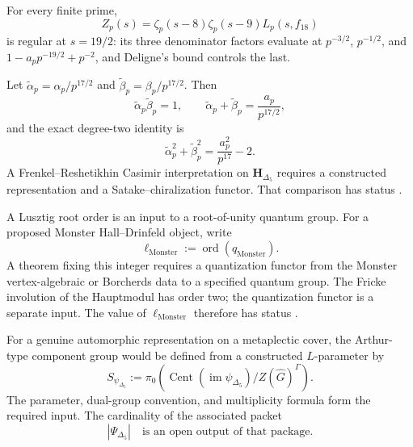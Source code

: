 \begin{remark}
\label{rem:cclimax-sk-euler}
For every finite prime,
\[
 Z_p(s)=\zeta_p(s-8)\zeta_p(s-9)L_p(s,f_{18})
\]
is regular at \(s=19/2\): its three denominator factors evaluate at
\(p^{-3/2}\), \(p^{-1/2}\), and
\(1-a_pp^{-19/2}+p^{-2}\), and Deligne's bound controls the last.
\end{remark}

\begin{remark}
\label{rem:cclimax-satake-casimir}
\label{rem:cclimax-satake-casimir-ii}
Let
\(\widetilde\alpha_p=\alpha_p/p^{17/2}\) and
\(\widetilde\beta_p=\beta_p/p^{17/2}\).  Then
\[
 \widetilde\alpha_p\widetilde\beta_p=1,\qquad
 \widetilde\alpha_p+\widetilde\beta_p=\frac{a_p}{p^{17/2}},
\]
and the exact degree-two identity is
\begin{equation}
\label{eq:cclimax-casimir-dictionary}
 \widetilde\alpha_p^2+\widetilde\beta_p^2
 =\frac{a_p^2}{p^{17}}-2.
\end{equation}
A Frenkel--Reshetikhin Casimir interpretation on
\(\mathbf H_{\Delta_5}\) requires a constructed representation and a
Satake--chiralization functor.  That comparison has status
\ClaimStatusOpen.
\end{remark}

\begin{remark}
\label{rem:cclimax-monster-lusztig-conway-norton}
\ClaimStatusOpen
A Lusztig root order is an input to a root-of-unity quantum group.
For a proposed Monster Hall--Drinfeld object, write
\begin{equation}
\label{eq:cclimax-monster-lusztig-level}
 \ell_{\mathrm{Monster}}
 :=\operatorname{ord}(q_{\mathrm{Monster}}).
\end{equation}
A theorem fixing this integer requires a quantization functor from the
Monster vertex-algebraic or Borcherds data to a specified quantum
group.  The Fricke involution of the Hauptmodul has order two; the
quantization functor is a separate input.  The value of
\(\ell_{\mathrm{Monster}}\) therefore has status \ClaimStatusOpen.
\end{remark}

\begin{remark}
\label{rem:cclimax-S-psi-delta5}
\ClaimStatusOpen
For a genuine automorphic representation on a metaplectic cover, the
Arthur-type component group would be defined from a constructed
\(L\)-parameter by
\begin{equation}
\label{eq:cclimax-S-psi-delta5}
 S_{\psi_{\Delta_5}}
 :=
 \pi_0\!\left(
 \operatorname{Cent}(\operatorname{im}\psi_{\Delta_5})/
 Z(\widehat G)^\Gamma
 \right).
\end{equation}
The parameter, dual-group convention, and multiplicity formula form
the required input.  The cardinality of the associated packet
\begin{equation}
\label{eq:cclimax-Psi-delta5-total}
 |\Psi_{\Delta_5}| \quad\text{is an open output of that package.}
\end{equation}
\end{remark}

